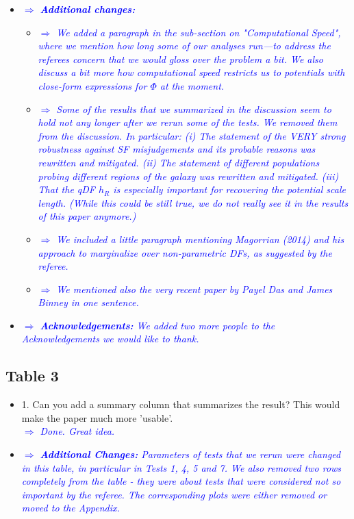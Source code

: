 \documentclass[10pt,a4paper]{article}
\newcommand{\Comment}[1]{\textsl{\textcolor{Blue}{$\Longrightarrow$ {#1}}}}
\begin{document}
\begin{itemize}
\item \Comment{\textbf{Additional changes:}}
\begin{itemize}
\item \Comment{We added a paragraph in the sub-section on "Computational Speed", where we mention how long some of our analyses run---to address the referees concern that we would gloss over the problem a bit. We also discuss a bit more how computational speed restricts us to potentials with close-form expressions for $\Phi$ at the moment.}
\item  \Comment{Some of the results that we summarized in the discussion seem to hold not any longer after we rerun some of the tests. We removed them from the discussion. In particular: (i) The statement of the VERY strong robustness against SF misjudgements and its probable reasons was rewritten and mitigated. (ii) The statement of different populations probing different regions of the galaxy was rewritten and mitigated. (iii) That the qDF $h_R$ is especially important for recovering the potential scale length. (While this could be still true, we do not really see it in the results of this paper anymore.)}
\item  \Comment{We included a little paragraph mentioning Magorrian (2014) and his approach to marginalize over non-parametric DFs, as suggested by the referee.}
\item  \Comment{We mentioned also the very recent paper by Payel Das and James Binney in one sentence.}
\end{itemize}
\item \Comment{\textbf{Acknowledgements:} We added two more people to the Acknowledgements we would like to thank.}
\end{itemize}

\subsection{Table 3}
\begin{itemize}
\item 1. Can you add a summary column that summarizes the result? This would make the paper much more 'usable'. \\\Comment{Done. Great idea.}
\item \Comment{\textbf{Additional Changes:} Parameters of tests that we rerun were changed in this table, in particular in Tests 1, 4, 5 and 7. We also removed two rows completely from the table - they were about tests that were considered not so important by the referee. The corresponding plots were either removed or moved to the Appendix.}
\end{itemize}
\end{document}
